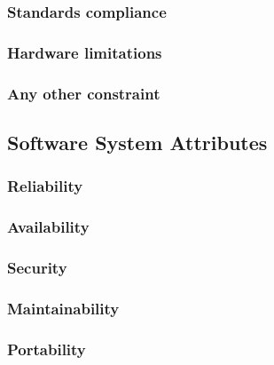 \subsubsection{Standards compliance}
\subsubsection{Hardware limitations}
\subsubsection{Any other constraint}

\subsection{Software System Attributes} %
\subsubsection{Reliability}
\subsubsection{Availability}
\subsubsection{Security}
\subsubsection{Maintainability}
\subsubsection{Portability}
